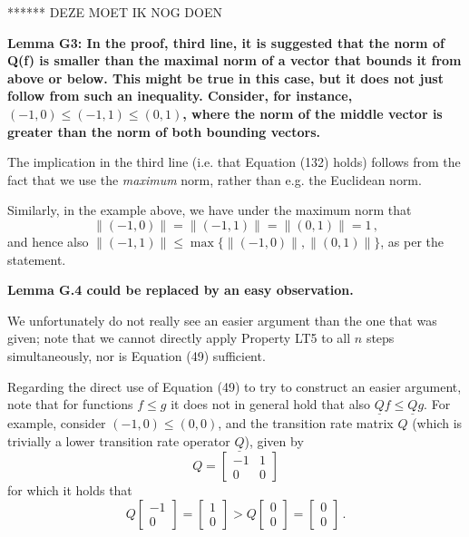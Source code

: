 \documentclass[twoside,11pt]{letter}
\begin{document}
****** DEZE MOET IK NOG DOEN

{\bf Lemma G3: In the proof, third line, it is suggested that the norm of Q(f) is smaller than the maximal norm of a 
vector that bounds it from above or below. This might be true in this case, but it does not just follow from such an inequality. 
Consider, for instance, $(-1, 0) \leq (-1, 1) \leq (0, 1)$, where the norm of the middle vector is greater than the norm of both bounding vectors. }

The implication in the third line (i.e. that Equation (132) holds) follows from the fact that we use the \emph{maximum} norm, rather than e.g. the Euclidean norm.

Similarly, in the example above, we have under the maximum norm that
\begin{equation}
\lVert(-1,0)\rVert = \lVert(-1,1)\rVert = \lVert(0,1)\rVert = 1\,,
\end{equation}
and hence also $\lVert(-1,1)\rVert \leq \max\{\lVert(-1,0)\rVert, \lVert(0,1)\rVert\}$, as per the statement.

{\bf Lemma G.4 could be replaced by an easy observation.   }

We unfortunately do not really see an easier argument than the one that was given; note that we cannot directly apply Property LT5 to all $n$ steps simultaneously, nor is Equation (49) sufficient.

Regarding the direct use of Equation (49) to try to construct an easier argument, note that for functions $f \leq g$ it does not in general hold that also $\underline{Q}f \leq \underline{Q}g$. For example, consider $(-1, 0) \leq (0, 0)$, and the transition rate matrix $Q$ (which is trivially a lower transition rate operator $\underline{Q}$), given by
\begin{equation}
Q = \left[\begin{array}{rr}
-1 & 1 \\
0 & 0
\end{array}\right]
\end{equation}
for which it holds that
\begin{equation}
Q\left[\begin{array}{r}-1 \\ 0\end{array}\right] = \left[\begin{array}{r}
1 \\ 0\end{array}\right] > Q\left[\begin{array}{r}0 \\ 0\end{array}\right] = \left[\begin{array}{r}0 \\ 0\end{array}\right]\,.
\end{equation}
\end{document}
